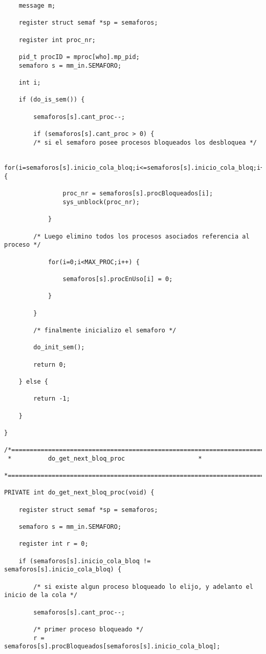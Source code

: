 \begin{verbatim}
	message m;

	register struct semaf *sp = semaforos;

	register int proc_nr;

	pid_t procID = mproc[who].mp_pid;
	semaforo s = mm_in.SEMAFORO;

	int i;

	if (do_is_sem()) {

		semaforos[s].cant_proc--;

		if (semaforos[s].cant_proc > 0) {
		/* si el semaforo posee procesos bloqueados los desbloquea */

			for(i=semaforos[s].inicio_cola_bloq;i<=semaforos[s].inicio_cola_bloq;i++) {

				proc_nr = semaforos[s].procBloqueados[i];
				sys_unblock(proc_nr);

			}

		/* Luego elimino todos los procesos asociados referencia al proceso */

			for(i=0;i<MAX_PROC;i++) {

				semaforos[s].procEnUso[i] = 0;

			}

		}

		/* finalmente inicializo el semaforo */

		do_init_sem();

		return 0;

	} else {

		return -1;

	}

}

/*===========================================================================*
 *			do_get_next_bloq_proc				     *
 *===========================================================================*/

PRIVATE int do_get_next_bloq_proc(void) {

	register struct semaf *sp = semaforos;

	semaforo s = mm_in.SEMAFORO;

	register int r = 0;

	if (semaforos[s].inicio_cola_bloq != semaforos[s].inicio_cola_bloq) {

		/* si existe algun proceso bloqueado lo elijo, y adelanto el inicio de la cola */

		semaforos[s].cant_proc--;

		/* primer proceso bloqueado */
		r = semaforos[s].procBloqueados[semaforos[s].inicio_cola_bloq];


\end{verbatim}
